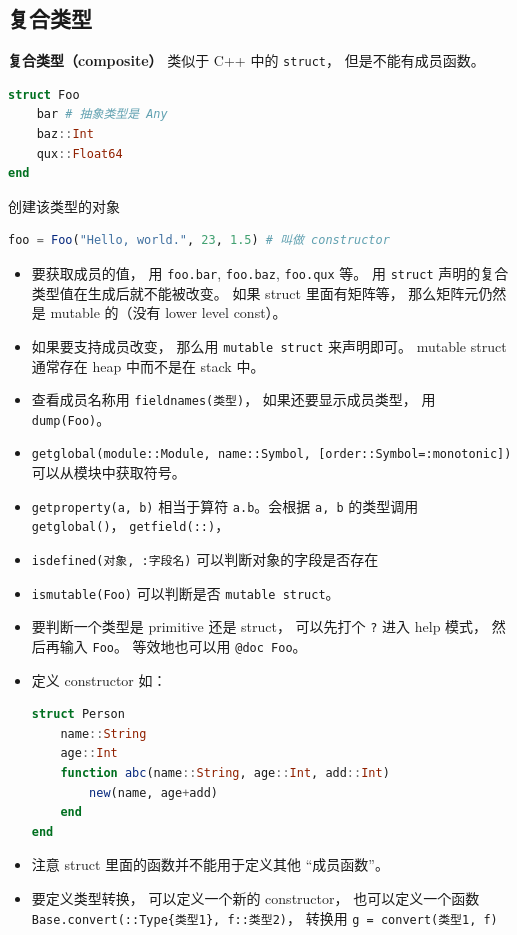 \subsection{复合类型}
\textbf{复合类型（composite）} 类似于 C++ 中的 \verb`struct`， 但是不能有成员函数。
\begin{lstlisting}[language=julia]
struct Foo
    bar # 抽象类型是 Any
    baz::Int
    qux::Float64
end
\end{lstlisting}
创建该类型的对象
\begin{lstlisting}[language=julia]
foo = Foo("Hello, world.", 23, 1.5) # 叫做 constructor
\end{lstlisting}
\begin{itemize}
\item 要获取成员的值， 用 \verb`foo.bar`, \verb`foo.baz`, \verb`foo.qux` 等。 用 \verb`struct` 声明的复合类型值在生成后就不能被改变。 如果 struct 里面有矩阵等， 那么矩阵元仍然是 mutable 的（没有 lower level const）。
\item 如果要支持成员改变， 那么用 \verb`mutable struct` 来声明即可。 mutable struct 通常存在 heap 中而不是在 stack 中。
\item 查看成员名称用 \verb`fieldnames(类型)`， 如果还要显示成员类型， 用 \verb`dump(Foo)`。
\item \verb`getglobal(module::Module, name::Symbol, [order::Symbol=:monotonic])` 可以从模块中获取符号。
\item \verb`getproperty(a, b)` 相当于算符 \verb`a.b`。会根据 \verb`a, b` 的类型调用 \verb`getglobal()`， \verb`getfield(::)`，
\item \verb`isdefined(对象, :字段名)` 可以判断对象的字段是否存在
\item \verb`ismutable(Foo)` 可以判断是否 \verb`mutable struct`。
\item 要判断一个类型是 primitive 还是 struct， 可以先打个 \verb`?` 进入 help 模式， 然后再输入 \verb`Foo`。 等效地也可以用 \verb`@doc Foo`。
\item 定义 constructor 如：
\begin{lstlisting}[language=julia]
struct Person
    name::String
    age::Int
    function abc(name::String, age::Int, add::Int)
        new(name, age+add)
    end
end
\end{lstlisting}
\item 注意 struct 里面的函数并不能用于定义其他 “成员函数”。
\item 要定义类型转换， 可以定义一个新的 constructor， 也可以定义一个函数 \verb`Base.convert(::Type{类型1}, f::类型2)`， 转换用 \verb`g = convert(类型1, f)`
\end{itemize}

